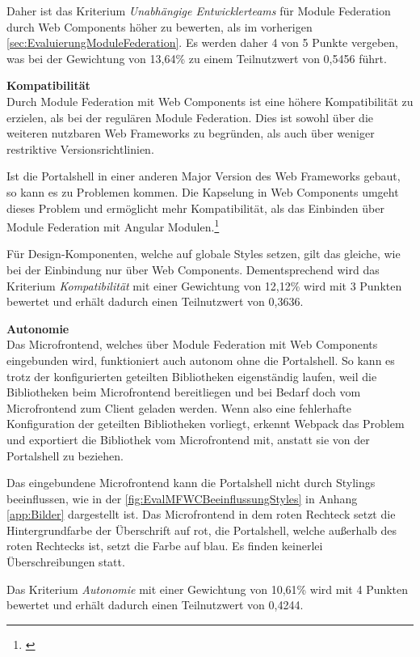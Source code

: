 Daher ist das Kriterium \textit{Unabhängige Entwicklerteams} für Module Federation durch Web Components höher zu bewerten, als im vorherigen \cref{sec:EvaluierungModuleFederation}. Es werden daher 4 von 5 Punkte vergeben, was bei der Gewichtung von 13,64\% zu einem Teilnutzwert von 0,5456 führt.

\textbf{Kompatibilität}\\
Durch Module Federation mit Web Components ist eine höhere Kompatibilität zu erzielen, als bei der regulären Module Federation. Dies ist sowohl über die weiteren nutzbaren Web Frameworks zu begründen, als auch über weniger restriktive Versionsrichtlinien.

Ist die Portalshell in einer anderen Major Version des Web Frameworks gebaut, so kann es zu Problemen kommen. Die Kapselung in Web Components umgeht dieses Problem und ermöglicht mehr Kompatibilität, als das Einbinden über Module Federation mit Angular Modulen.\footnote{\cite[vgl.][]{Steyer2021a}}

Für Design-Komponenten, welche auf globale Styles setzen, gilt das gleiche, wie bei der Einbindung nur über Web Components. Dementsprechend wird das Kriterium \textit{Kompatibilität} mit einer Gewichtung von 12,12\% wird mit 3 Punkten bewertet und erhält dadurch einen Teilnutzwert von 0,3636.

\textbf{Autonomie}\\
Das Microfrontend, welches über Module Federation mit Web Components eingebunden wird, funktioniert auch autonom ohne die Portalshell. So kann es trotz der konfigurierten geteilten Bibliotheken eigenständig laufen, weil die Bibliotheken beim Microfrontend bereitliegen und bei Bedarf doch vom Microfrontend zum Client geladen werden.
Wenn also eine fehlerhafte Konfiguration der geteilten Bibliotheken vorliegt, erkennt Webpack das Problem und exportiert die Bibliothek vom Microfrontend mit, anstatt sie von der Portalshell zu beziehen.

Das eingebundene Microfrontend kann die Portalshell nicht durch Stylings beeinflussen, wie in der \cref{fig:EvalMFWCBeeinflussungStyles} in Anhang \ref{app:Bilder} dargestellt ist. Das Microfrontend in dem roten Rechteck setzt die Hintergrundfarbe der Überschrift auf rot, die Portalshell, welche außerhalb des roten Rechtecks ist, setzt die Farbe auf blau. Es finden keinerlei Überschreibungen statt.

Das Kriterium \textit{Autonomie} mit einer Gewichtung von 10,61\% wird mit 4 Punkten bewertet und erhält dadurch einen Teilnutzwert von 0,4244.

